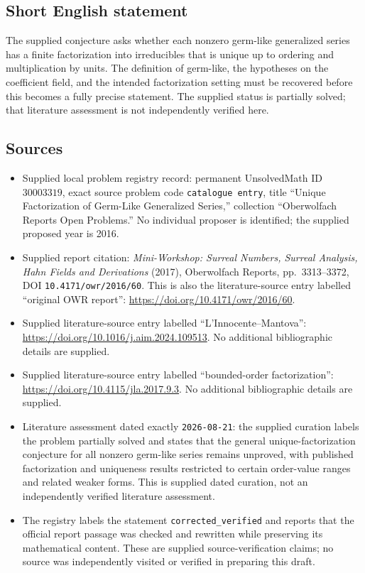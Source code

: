 \documentclass[11pt]{article}
\begin{document}
\subsection{Short English statement}
The supplied conjecture asks whether each nonzero germ-like generalized series has a finite factorization into irreducibles that is unique up to ordering and multiplication by units. The definition of germ-like, the hypotheses on the coefficient field, and the intended factorization setting must be recovered before this becomes a fully precise statement. The supplied status is partially solved; that literature assessment is not independently verified here.
\subsection{Sources}
\begin{itemize}
\item Supplied local problem registry record: permanent UnsolvedMath ID \(30003319\), exact source problem code \texttt{catalogue entry}, title ``Unique Factorization of Germ-Like Generalized Series,'' collection ``Oberwolfach Reports Open Problems.'' No individual proposer is identified; the supplied proposed year is 2016.
\item Supplied report citation: \emph{Mini-Workshop: Surreal Numbers, Surreal Analysis, Hahn Fields and Derivations} (2017), Oberwolfach Reports, pp.\ 3313--3372, DOI \texttt{10.4171/owr/2016/60}. This is also the literature-source entry labelled ``original OWR report'': \url{https://doi.org/10.4171/owr/2016/60}.
\item Supplied literature-source entry labelled ``L'Innocente--Mantova'': \url{https://doi.org/10.1016/j.aim.2024.109513}. No additional bibliographic details are supplied.
\item Supplied literature-source entry labelled ``bounded-order factorization'': \url{https://doi.org/10.4115/jla.2017.9.3}. No additional bibliographic details are supplied.
\item Literature assessment dated exactly \texttt{2026-08-21}: the supplied curation labels the problem partially solved and states that the general unique-factorization conjecture for all nonzero germ-like series remains unproved, with published factorization and uniqueness results restricted to certain order-value ranges and related weaker forms. This is supplied dated curation, not an independently verified literature assessment.
\item The registry labels the statement \texttt{corrected\_verified} and reports that the official report passage was checked and rewritten while preserving its mathematical content. These are supplied source-verification claims; no source was independently visited or verified in preparing this draft.
\end{itemize}
\end{document}
